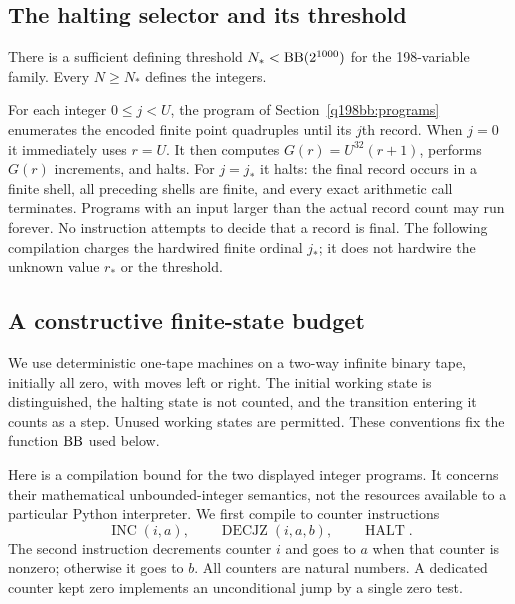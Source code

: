 \subsection{The halting selector and its threshold}
\begin{theorem}\label{q198bb:threshold}
There is a sufficient defining threshold $N_*<\operatorname{BB}(2^{1000})$ for the
198-variable family. Every $N\ge N_*$ defines the integers.
\end{theorem}
For each integer $0\le j<U$, the program of
Section~\ref{q198bb:programs} enumerates the encoded finite point
quadruples until its $j$th record. When $j=0$ it immediately uses $r=U$.
It then computes $G(r)=U^{32}(r+1)$, performs $G(r)$ increments, and halts.
For $j=j_*$ it halts: the final record occurs in a finite shell, all
preceding shells are finite, and every exact arithmetic call terminates.
Programs with an input larger than the actual record count may run
forever. No instruction attempts to decide that a record is final.
The following compilation charges the hardwired finite ordinal $j_*$;
it does not hardwire the unknown value $r_*$ or the threshold.

\subsection{A constructive finite-state budget}\label{q198bb:compiler}
We use deterministic one-tape machines on a two-way infinite binary
tape, initially all zero, with moves left or right. The initial
working state is distinguished, the halting state is not counted,
and the transition entering it counts as a step. Unused working
states are permitted. These conventions fix the function $\operatorname{BB}$ used
below.

Here is a compilation bound for the two displayed integer programs.
It concerns their mathematical unbounded-integer semantics, not the
resources available to a particular Python interpreter. We first
compile to counter instructions
\[
 \operatorname{INC}(i,a),\qquad
 \operatorname{DECJZ}(i,a,b),\qquad \operatorname{HALT}.
\]
The second instruction decrements counter $i$ and goes to $a$ when
that counter is nonzero; otherwise it goes to $b$. All counters are
natural numbers. A dedicated counter kept zero implements an
unconditional jump by a single zero test.

